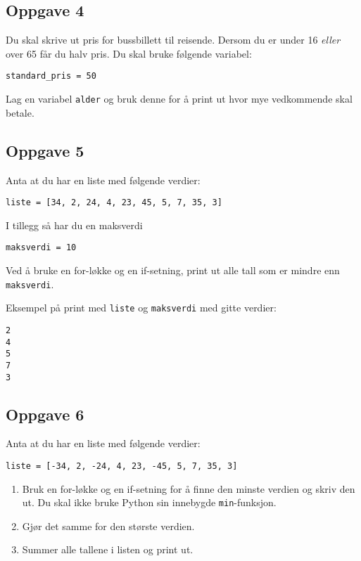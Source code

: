 \documentclass{article}
\begin{document}
\subsection*{Oppgave 4}
Du skal skrive ut pris for bussbillett til reisende. Dersom du er under 16 \textit{eller} over 65 får du halv pris. Du skal bruke følgende variabel:

\begin{verbatim}
standard_pris = 50
\end{verbatim}

Lag en variabel \texttt{alder} og bruk denne for å print ut hvor mye vedkommende skal betale.

\subsection*{Oppgave 5}
Anta at du har en liste med følgende verdier:

\begin{verbatim}
liste = [34, 2, 24, 4, 23, 45, 5, 7, 35, 3]
\end{verbatim}
I tillegg så har du en maksverdi
\begin{verbatim}
maksverdi = 10
\end{verbatim}

Ved å bruke en for-løkke og en if-setning, print ut alle tall som er mindre enn \texttt{maksverdi}.

Eksempel på print med \texttt{liste} og \texttt{maksverdi} med gitte verdier:
\begin{verbatim}
2
4
5
7
3
\end{verbatim}

\subsection*{Oppgave 6}
Anta at du har en liste med følgende verdier:

\begin{verbatim}
liste = [-34, 2, -24, 4, 23, -45, 5, 7, 35, 3]
\end{verbatim}

\begin{enumerate}
\item Bruk en for-løkke og en if-setning for å finne den minste verdien og skriv den ut. Du skal ikke bruke Python sin innebygde \texttt{min}-funksjon.
\item Gjør det samme for den største verdien.
\item Summer alle tallene i listen og print ut.
\end{enumerate}
\end{document}
